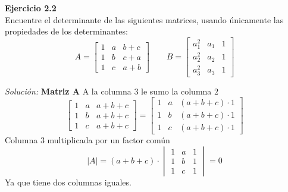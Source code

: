 \documentclass{article}
\newenvironment{problem}[2][Ejercicio]
    { \begin{mdframed}[backgroundcolor=gray!20] \textbf{#1 #2} \\}
    {  \end{mdframed}}
\newenvironment{solution}
    {\textit{Solución:}}
    {}
\begin{document}
\begin{problem}{2.2}
Encuentre el determinante de las siguientes matrices, usando únicamente las propiedades de los determinantes:
\[
A = \begin{bmatrix}
1 & a & b+c \\
1 & b & c+a \\
1 & c & a+b
\end{bmatrix} \ \ \ \ \ \ \ \ \
B = \begin{bmatrix}
a_1^2 & a_1 & 1 \\
a_2^2 & a_2 & 1 \\
a_3^2 & a_3 & 1
\end{bmatrix}
\]
\end{problem}
\begin{solution}	
    \textbf{Matriz A}
    A la columna $3$ le sumo la columna $2$
    \[
    \begin{bmatrix}
    1 & a & a+b+c \\
    1 & b & a+b+c \\
    1 & c & a+b+c
    \end{bmatrix} =
    \begin{bmatrix}
    1 & a & (a+b+c)\cdot 1 \\
    1 & b & (a+b+c)\cdot 1 \\
    1 & c & (a+b+c) \cdot 1
    \end{bmatrix}
    \]
    Columna $3$ multiplicada por un factor común
    \[
    | A | = (a + b + c) \cdot 
    \begin{vmatrix}
    1 & a & 1 \\
    1 & b & 1 \\
    1 & c & 1
    \end{vmatrix} = 0
    \]
    Ya que tiene dos columnas iguales.
    

\end{solution}
\end{document}
